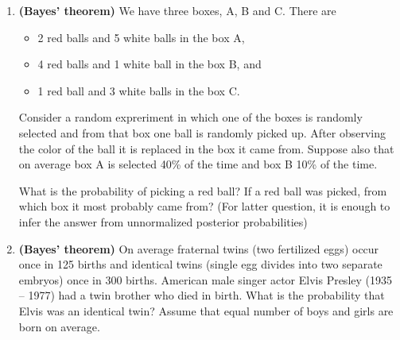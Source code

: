 \documentclass[11pt,a4paper,english]{article}
\begin{document}
\begin{enumerate}
\item {\bf (Bayes' theorem)} We have three boxes, A, B and C. There are
  \begin{itemize}
    \item 2 red balls and 5 white balls in the box A,
    \item 4 red balls and 1 white ball in the box B, and
    \item 1 red ball and 3 white balls in the box C.
  \end{itemize}
Consider a random expreriment in which one of the boxes is randomly
selected and from that box one ball is randomly picked up. After
observing the color of the ball it is replaced in the box it came
from. Suppose also that on average box A is selected 40\% of the time
and box B 10\% of the time.

What is the probability of picking a red ball? If a red ball was
picked, from which box it most probably came from? (For latter question, it is enough to infer the answer from unnormalized posterior probabilities)



\item {\bf (Bayes' theorem)} On average fraternal twins (two fertilized eggs) occur once in 125
births and identical twins (single egg divides into two separate
embryos) once in 300 births.
American male singer actor Elvis Presley (1935 -- 1977) had a twin brother who died in birth.
What is the probability that Elvis was an identical twin?
Assume that equal number of boys and girls are born on average.






\end{enumerate}
\end{document}
